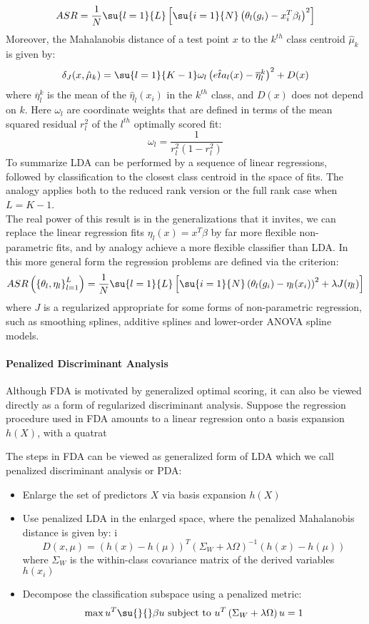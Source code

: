 $$ASR = \dfrac{1}{N}\su{{l=1}}{L}\left[\su{{i=1}}{N}\left(\theta_{l}(g_{i})-x_{i}^{T}\beta_{l}
\right)^{2}\right] $$
Moreover, the Mahalanobis distance of a test point $x$ to the $k^{th}$ class centroid $\hat{\mu}_{
k}$ is given by:
$$ \delta_{J}(x,\hat{\mu}_{k}) = \su{{l=1}}{K-1}\omega_{l}\left(\hat{eta}_{l}(x)-\overline{\eta}_{
l}^{k}\right)^{2} + D(x)$$
where $\overline{\eta}_{l}^{k}$ is the mean of the $\hat{\eta}_{l}(x_{i})$ in the $k^{th}$ class,
and $D(x)$ does not depend on $k$. Here $\omega_{l}$ are coordinate weights that are defined
in terms of the mean squared residual $r_{l}^{2}$ of the $l^{th}$ optimally scored fit:
$$ \omega_{l}= \dfrac{1}{r_{l}^{2}(1-r_{l}^{2})}$$ To summarize LDA can be performed by a
sequence of linear regressions, followed by classification to the closest class centroid in
the space of fits. The analogy applies both to the reduced rank version or the full rank case
when $L=K-1$. \\
The real power of this result is in the generalizations that it invites, we can replace the linear
regression fits $\eta_{l}(x) = x^{T}\beta$ by far more flexible non-parametric fits, and by 
analogy achieve a more flexible classifier than LDA. In this more general form the regression 
problems are defined via the criterion:
$$ ASR\left(\left\{\theta_{l},\eta_{l}\right\}_{l=1}^{L}\right)=\dfrac{1}{N}\su{{l=1}}{L}\left[
\su{{i=1}}{N}\left(\theta_{l}(g_{i})-\eta_{l}(x_{i}) \right)^{2} +\lambda J(\eta_{l})\right]$$
where $J$ is a regularized appropriate for some forms of non-parametric regression, such as 
smoothing splines, additive splines and lower-order ANOVA spline models.

\paragraph{Penalized Discriminant Analysis}
Although FDA is motivated by generalized optimal scoring, it can also be viewed directly as a
form of regularized discriminant analysis. Suppose the regression procedure used in FDA amounts
to a linear regression onto a basis expansion $h(X)$, with a quatrat

The steps in FDA can be viewed as generalized form of LDA which we call penalized discriminant
analysis or PDA:
\begin{itemize}
	\item Enlarge the set of predictors $X$ via basis expansion $h(X)$
	\item Use penalized LDA in the enlarged space, where the penalized Mahalanobis distance
		is given by:
		i$$D(x,\mu)=\left(h(x)-h(\mu)\right)^{T}\left(\Sigma_{W}+\lambda\Omega \right)^{
		-1}\left(h(x)-h(\mu)\right)$$ where $\Sigma_{W}$ is the within-class covariance
		matrix of the derived variables $h(x_{i})$
	\item Decompose the classification subspace using a penalized metric:
		$$ \max u^{T}\su{}{}\beta u\text{ subject to }u^{T}\left(\Sigma_{W}+\lambda\Omega\right)u = 1$$
\end{itemize}

